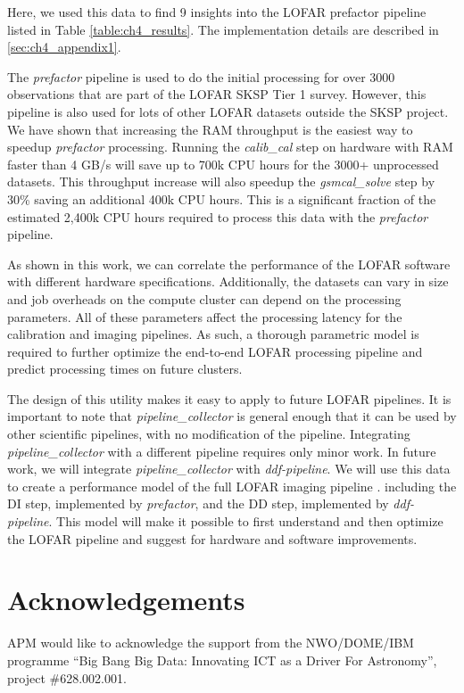 Here, we used this data to find 9 insights into the LOFAR prefactor pipeline listed in Table \ref{table:ch4_results}. The implementation details are described in \ref{sec:ch4_appendix1}.

The \textit{prefactor} pipeline is used to do the initial processing for over 3000 observations that are part of the LOFAR SKSP Tier 1 survey. However, this pipeline is also used for lots of other LOFAR datasets outside the SKSP project. We have shown that increasing the RAM throughput is the easiest way to speedup \textit{prefactor} processing. Running the \textit{calib\_cal} step on hardware with RAM faster than 4 GB/s will save up to 700k CPU hours for the 3000+ unprocessed datasets. This throughput increase will also speedup the \textit{gsmcal\_solve} step by 30\% saving an additional 400k CPU hours. This is a significant fraction of the estimated 2,400k CPU hours required to process this data with the \textit{prefactor} pipeline. 

As shown in this work, we can correlate the performance of the LOFAR software with different hardware specifications. Additionally, the datasets  can vary in size and job overheads on the compute cluster can depend on the processing parameters. All of these parameters affect the processing latency for the calibration and imaging pipelines. As such, a thorough parametric model is required to further optimize the end-to-end LOFAR processing pipeline and predict processing times on future clusters.

The design of this utility makes it easy to apply to future LOFAR pipelines. It is important to note that \textit{pipeline\_collector} is general enough that it can be used by other scientific pipelines, with no modification of the pipeline. Integrating \textit{pipeline\_collector} with a different pipeline requires only minor work. In future work, we will integrate \textit{pipeline\_collector} with \textit{ddf-pipeline}. We will use this data to create a performance model of the full LOFAR imaging pipeline \citep{lofar_prefactor,Wendy_bootes,tassesmirnov}.  including the DI step, implemented by \textit{prefactor}, and  the DD step, implemented by \textit{ddf-pipeline}. This model will make it possible to first understand and then optimize the LOFAR pipeline and suggest for hardware and software improvements. 



\section*{Acknowledgements}
APM would like to acknowledge the support from the NWO/DOME/IBM programme ``Big Bang Big Data: Innovating ICT as a Driver For Astronomy'', project \#628.002.001.


